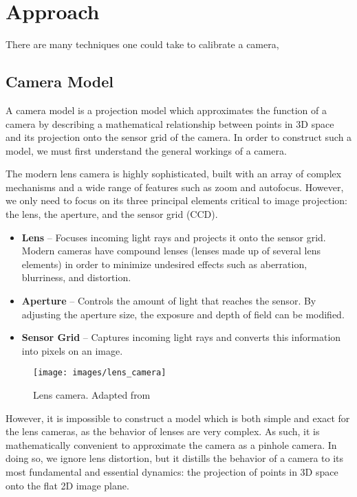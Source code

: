\section{Approach} 

There are many techniques one could take to calibrate a camera, 




\subsection{Camera Model} \label{sec:camera_model}

A camera model is a projection model which approximates the function of a camera by describing a mathematical relationship between points in 3D space and its projection onto the sensor grid of the camera. In order to construct such a model, we must first understand the general workings of a camera.

The modern lens camera is highly sophisticated, built with an array of complex mechanisms and a wide range of features such as zoom and autofocus. However, we only need to focus on its three principal elements critical to image projection: the lens, the aperture, and the sensor grid (CCD). 

\begin{itemize}[leftmargin=!, itemindent=-5ex]
    \item \textbf{Lens} -- Focuses incoming light rays and projects it onto the sensor grid. Modern cameras have compound lenses (lenses made up of several lens elements) in order to minimize undesired effects such as aberration, blurriness, and distortion. 
    \item \textbf{Aperture} -- Controls the amount of light that reaches the sensor. By adjusting the aperture size, the exposure and depth of field can be modified.
    \item \textbf{Sensor Grid} -- Captures incoming light rays and converts this information into pixels on an image. 
\end{itemize}

\begin{figure}[H]
    \centering
    \texttt{[image: images/lens\_camera]}
    \caption{Lens camera. Adapted from \cite{coltonPhysics1232012}} \label{fig:lens_camera}
\end{figure}

However, it is impossible to construct a model which is both simple and exact for the lens cameras, as the behavior of lenses are very complex. As such, it is mathematically convenient to approximate the camera as a pinhole camera. In doing so, we ignore lens distortion, but it distills the behavior of a camera to its most fundamental and essential dynamics: the projection of points in 3D space onto the flat 2D image plane. 


